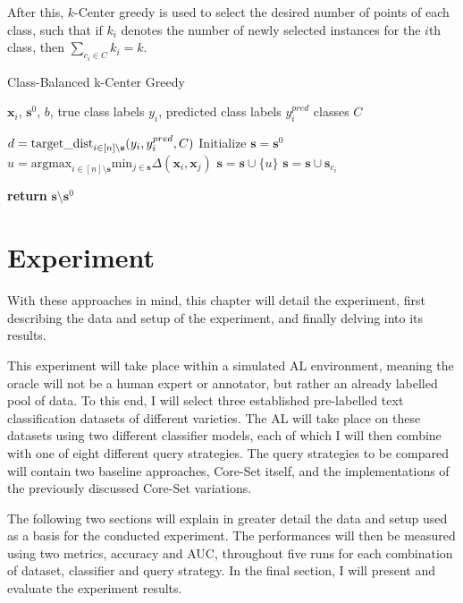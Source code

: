 \documentclass[english,bachelor,ul]{webisthesis} %
\begin{document}
After this, $k$-Center greedy is used to select the desired number of points of each class, such that if $ k_i $ denotes the number of newly selected instances for the $ i $th class, then $ \sum_{c_i \in C} k_i = k $. 

\begin{algorithm}
    \caption{Class-Balanced k-Center Greedy}%
\makeatletter{}\makeatother
\label{alg:classbalanced}
\begin{algorithmic}

\Require $ \mathbf{x}_i $, $ \mathbf{s}^0 $, $ b $, true class labels $ y_i $, predicted class labels $ y^{pred}_i $ classes $ C $

\State $ d = \text{target\textunderscore dist}_{i \in [n] \setminus \mathbf{s}} (y_i, y^{pred}_i, C) $
\State Initialize $ \mathbf{s} = \mathbf{s}^0 $
\Repeat
\State $ u = \text{argmax}_{i \in [n] \setminus \mathbf{s}} \text{min}_{j \in \mathbf{s}} \Delta(\mathbf{x}_i, \mathbf{x}_j) $
\State $ \mathbf{s} = \mathbf{s} \cup \{u\} $
\State $ \mathbf{s} = \mathbf{s} \cup \mathbf{s}_{c_i} $
\EndFor

\State \textbf{return} $\mathbf{s} \setminus \mathbf{s}^0 $
\end{algorithmic}
\end{algorithm}

\chapter{Experiment}

With these approaches in mind, this chapter will detail the experiment, first describing the data and setup of the experiment, and finally delving into its results. 

This experiment will take place within a simulated AL environment, meaning the oracle will not be a human expert or annotator, but rather an already labelled pool of data. To this end, I will select three established pre-labelled text classification datasets of different varieties. The AL will take place on these datasets using two different classifier models, each of which I will then combine with one of eight different query strategies. The query strategies to be compared will contain two baseline approaches, Core-Set itself, and the implementations of the previously discussed Core-Set variations. 

The following two sections will explain in greater detail the data and setup used as a basis for the conducted experiment. The performances will then be measured using two metrics, accuracy and AUC, throughout five runs for each combination of dataset, classifier and query strategy. In the final section, I will present and evaluate the experiment results.
\end{document}

